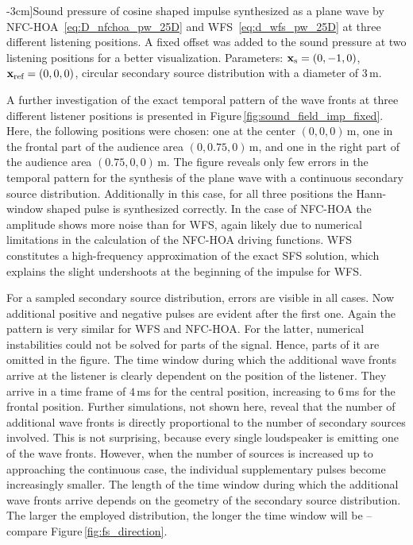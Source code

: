 \begin{figure*}[tb]
    \small
    
    \caption[][-3cm]{Sound pressure of cosine shaped impulse synthesized as a
    plane wave by \ac{NFC-HOA}~\protect\eqref{eq:D_nfchoa_pw_25D} and
    \ac{WFS}~\protect\eqref{eq:d_wfs_pw_25D} at three different listening
    positions. A fixed offset was added to the sound pressure at two listening
    positions for a better visualization.
    Parameters: $\mathbf{x}_\text{s} = (0,-1,0)$, $\mathbf{x}_\text{ref}=(0,0,0)$, circular secondary source
    distribution with a diameter of $3$\,m.
    }
    \label{fig:sound_field_imp_fixed}
\end{figure*}
%
A further investigation of the exact temporal pattern of the wave
fronts at three different listener positions is presented in
Figure\,\ref{fig:sound_field_imp_fixed}. Here, the following positions were
chosen: one at the center
$(0,0,0)$\,m, one in the frontal part of the audience area $(0,0.75,0)$\,m, and
one in the right part of the audience area $(0.75,0,0)$\,m. The
figure reveals only few errors in the temporal pattern for the synthesis of
the plane wave with a continuous secondary source distribution.
Additionally in this case, for all three positions the Hann-window shaped pulse is synthesized
correctly. In the case of \ac{NFC-HOA} the amplitude shows more noise than
for \ac{WFS},
again likely due to numerical limitations in the calculation of the \ac{NFC-HOA}
driving functions.
\ac{WFS} constitutes a high-frequency approximation of the exact \ac{SFS}
solution, which explains the slight undershoots at the beginning of the impulse
for \ac{WFS}.

For a sampled secondary source distribution, errors are visible in all cases. Now
additional positive and negative pulses are evident after the first one. Again
the pattern is very similar for \ac{WFS} and \ac{NFC-HOA}. For the latter, 
numerical instabilities could not be solved for parts of the signal.
Hence, parts of it are omitted in the figure.
The time window during which  the additional
wave fronts arrive at the listener is clearly dependent on the position of the
listener. They arrive in a time frame of $4$\,ms for the central position,
increasing to $6$\,ms for the frontal position.
Further simulations, not shown here, reveal that the number of additional wave
fronts is directly  proportional to the number of secondary sources involved.
This is not surprising, because every single loudspeaker is emitting one of the
wave fronts. However, when the number of sources is increased up to approaching
the continuous case, the individual supplementary pulses become increasingly
smaller.
The length of the time window during which the additional wave fronts
arrive depends on the geometry of the secondary source distribution. The
larger the employed distribution, the longer the time window will be -- compare
Figure\,\ref{fig:fs_direction}.

